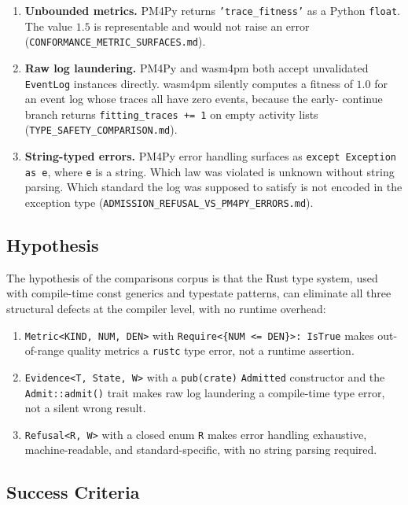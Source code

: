 \begin{enumerate}
  \item \textbf{Unbounded metrics.} PM4Py returns \texttt{'trace\_fitness'} as a
    Python \texttt{float}. The value $1.5$ is representable and would not raise an
    error (\texttt{CONFORMANCE\_METRIC\_SURFACES.md}).
  \item \textbf{Raw log laundering.} PM4Py and wasm4pm both accept unvalidated
    \texttt{EventLog} instances directly. wasm4pm silently computes a fitness of
    $1.0$ for an event log whose traces all have zero events, because the early-
    continue branch returns \texttt{fitting\_traces += 1} on empty activity lists
    (\texttt{TYPE\_SAFETY\_COMPARISON.md}).
  \item \textbf{String-typed errors.} PM4Py error handling surfaces as
    \texttt{except Exception as e}, where \texttt{e} is a string. Which law was
    violated is unknown without string parsing. Which standard the log was supposed
    to satisfy is not encoded in the exception type
    (\texttt{ADMISSION\_REFUSAL\_VS\_PM4PY\_ERRORS.md}).
\end{enumerate}

\subsection{Hypothesis}
\label{sec:comparisons-rq-hypothesis}

The hypothesis of the comparisons corpus is that the Rust type system, used with
compile-time const generics and typestate patterns, can eliminate all three
structural defects at the compiler level, with no runtime overhead:

\begin{enumerate}
  \item \texttt{Metric<KIND, NUM, DEN>} with \texttt{Require<\{NUM <= DEN\}>:
    IsTrue} makes out-of-range quality metrics a \texttt{rustc} type error, not a
    runtime assertion.
  \item \texttt{Evidence<T, State, W>} with a \texttt{pub(crate)} \texttt{Admitted}
    constructor and the \texttt{Admit::admit()} trait makes raw log laundering a
    compile-time type error, not a silent wrong result.
  \item \texttt{Refusal<R, W>} with a closed enum \texttt{R} makes error handling
    exhaustive, machine-readable, and standard-specific, with no string parsing
    required.
\end{enumerate}

\subsection{Success Criteria}
\label{sec:comparisons-rq-success}

